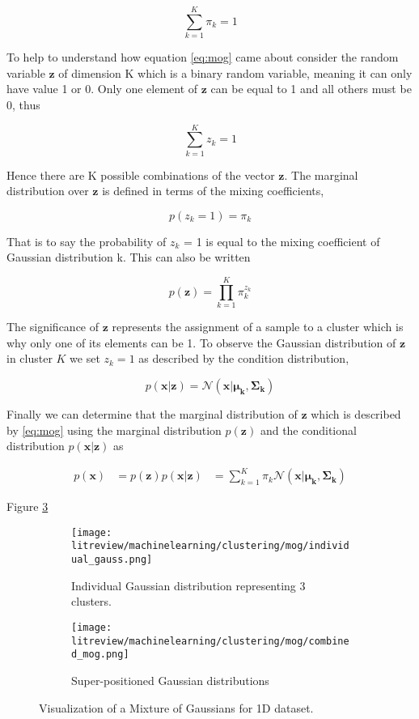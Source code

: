 \[\sum_{k=1}^K\pi_k = 1\]

To help to understand how equation \ref{eq:mog} came about consider the random variable $\boldsymbol{z}$ of dimension K which is a binary random variable, meaning it can only have value 1 or 0. Only one element of $\boldsymbol{z}$ can be equal to 1 and all others must be 0, thus

\[\sum_{k=1}^Kz_k = 1\]

Hence there are K possible combinations of the vector $\boldsymbol{z}$. The marginal distribution over $\boldsymbol{z}$ is defined in terms of the mixing coefficients, 

\[p(z_k = 1) = \pi_k\]

That is to say the probability of $z_k$ = 1 is equal to the mixing coefficient of Gaussian distribution k. This can also be written

\[p(\boldsymbol{z}) = \prod^K_{k=1}\pi^{z_k}_k\]

The significance of $\boldsymbol{z}$ represents the assignment of a sample to a cluster which is why only one of its elements can be 1. To observe the Gaussian distribution of $\boldsymbol{z}$ in cluster $K$ we set $z_k = 1$ as described by the condition distribution,

\[p(\bm{x}|\boldsymbol{z}) = \mathcal{N}(\boldsymbol{x}|\boldsymbol{\mu_k}, \boldsymbol{\Sigma_k}) \]

Finally we can determine that the marginal distribution of $\boldsymbol{z}$ which is described by \ref{eq:mog} using the marginal distribution $p(\boldsymbol{z})$ and the conditional distribution $p(\bm{x}|\bm{z})$ as 

\begin{align}
	p(\bm{x}) 	&= p(\bm{z})p(\bm{x}|\bm{z})
				&= \sum^{K}_{k = 1}\pi_k \mathcal{N}(\boldsymbol{x}|\boldsymbol{\mu_k}, \boldsymbol{\Sigma_k})
\label{eq:mog_derive}
\end{align}

Figure \ref{fig:mog_compare}

\begin{figure}[htbp]
    \centering
     \begin{subfigure}[b]{0.45\textwidth}
        \texttt{[image: litreview/machinelearning/clustering/mog/individual\_gauss.png]}
	\captionsetup{format = hang}
        \caption{Individual Gaussian distribution representing 3 clusters.}
        \label{fig:mog_singles}
    \end{subfigure} 
    \begin{subfigure}[b]{0.45\textwidth}
        \texttt{[image: litreview/machinelearning/clustering/mog/combined\_mog.png]}	
	\captionsetup{format = hang}
        \caption{Super-positioned Gaussian distributions}
        \label{fig:mog_combined}
    \end{subfigure}
    \captionsetup{format = hang}
    \caption{Visualization of a Mixture of Gaussians for 1D dataset.}
    \label{fig:mog_compare}
\end{figure}












